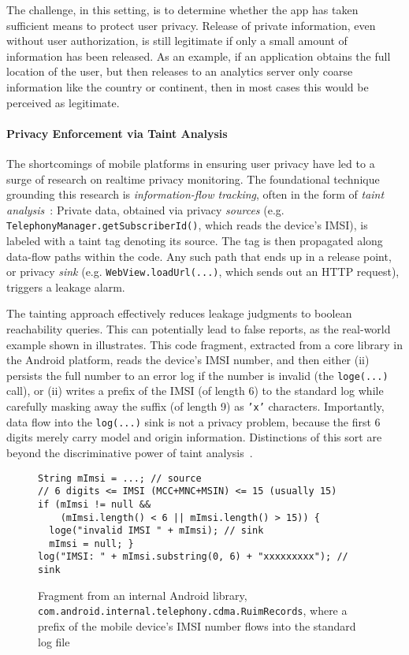 The challenge, in this setting, is to determine whether the app has taken sufficient means to protect user privacy. Release of private information, even without user authorization, is still legitimate if only a small amount of information has been released. As an example, if an application obtains the full location of the user, but then releases to an analytics server only coarse information like the country or continent, then in most cases this would be perceived as legitimate.

\paragraph{Privacy Enforcement via Taint Analysis} The shortcomings of mobile platforms in ensuring user privacy have led to a surge of research on realtime privacy monitoring. The foundational technique grounding this research is \emph{information-flow tracking}, often in the form of \emph{taint analysis}~\cite{TPFSW:PLDI09,NS:NDSS05}: Private data, obtained via privacy \emph{sources} (e.g. {\tt TelephonyManager.getSubscriberId()}, which reads the device's IMSI), is labeled with a taint tag denoting its source. The tag is then propagated along data-flow paths within the code. Any such path that ends up in a release point, or privacy \emph{sink} (e.g. {\tt WebView.loadUrl(...)}, which sends out an HTTP request), triggers a leakage alarm.

The tainting approach effectively reduces leakage judgments to boolean reachability queries. This can potentially lead to false reports, as the real-world example shown in  illustrates. This code fragment, extracted from a core library in the Android platform, reads the device's IMSI number, and then either (ii) persists the full number to an error log if the number is invalid (the {\tt loge(...)} call), or (ii) writes a prefix of the IMSI (of length 6) to the standard log while carefully masking away the suffix (of length 9) as {\tt 'x'} characters. Importantly, data flow into the {\tt log(...)} sink is not a privacy problem, because the first 6 digits merely carry model and origin information. Distinctions of this sort are beyond the discriminative power of taint analysis~\cite{WCGHHJSW:HOTOS13}.

\begin{figure}
\begin{lstlisting}
String mImsi = ...; // source
// 6 digits <= IMSI (MCC+MNC+MSIN) <= 15 (usually 15)
if (mImsi != null &&
    (mImsi.length() < 6 || mImsi.length() > 15)) {
  loge("invalid IMSI " + mImsi); // sink
  mImsi = null; }
log("IMSI: " + mImsi.substring(0, 6) + "xxxxxxxxx"); // sink
\end{lstlisting}
\caption{\label{Fi:quantitative}Fragment from an internal Android library, {\tt com.android.internal.telephony.cdma.RuimRecords}, where a prefix of the mobile device's IMSI number flows into the standard log file}
\end{figure}

